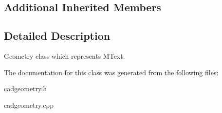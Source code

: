 \subsection*{Additional Inherited Members}


\subsection{Detailed Description}
Geometry class which represents M\+Text. 

The documentation for this class was generated from the following files\+:\begin{DoxyCompactItemize}
\item 
cadgeometry.\+h\item 
cadgeometry.\+cpp\end{DoxyCompactItemize}
